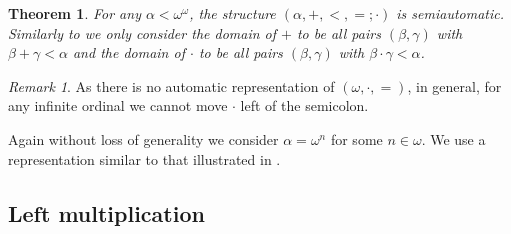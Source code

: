 \documentclass[british,a4paper,11pt,abstract=on]{scrreprt}
\newtheorem{theorem}{Theorem}
\theoremstyle{definition}
\theoremstyle{remark}
\newtheorem*{remark}{Remark}
\begin{document}
\begin{theorem} \label{semiautomatic delhomme}
    For any \(\alpha < \omega^\omega\), the structure \((\alpha,+,<,=;\cdot)\) is semiautomatic.
    Similarly to  we only consider the domain of \(+\) to be all pairs \((\beta,\gamma)\) with \(\beta + \gamma < \alpha\) and
    the domain of \(\cdot\) to be all pairs \((\beta,\gamma)\) with \(\beta\cdot\gamma<\alpha\).
\end{theorem}
\begin{remark}
    As there is no automatic representation of \((\omega, \cdot, =)\), in general,
    for any infinite ordinal we cannot move \(\cdot\) left of the semicolon.
\end{remark}

Again without loss of generality we consider \(\alpha = \omega^n\) for some \(n\in\omega\).
We use a representation similar to that illustrated in .

\subsection{Left multiplication}
\end{document}
